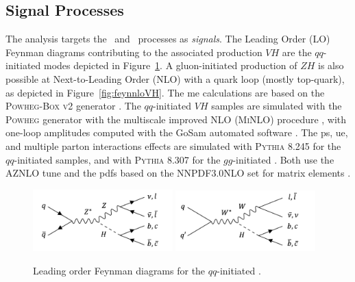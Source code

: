\subsection{Signal Processes}
The analysis targets the \vhb\ and \vhc\ processes as \textit{signals}. The Leading Order (LO) Feynman diagrams contributing to the associated production $VH$ are the $qq$-initiated modes depicted in Figure~\ref{fig:feynloVH}. A gluon-initiated production of $ZH$ is also possible at Next-to-Leading Order (NLO) with a quark loop (mostly top-quark), as depicted in Figure~\ref{fig:feynnloVH}. The \gls{me} calculations are based on the \textsc{Powheg-Box v2} generator \cite{StefanoFrixione_20072, POWHEGBOX}. The $qq$-initiated $VH$ samples are simulated with the \textsc{Powheg} generator with the multiscale improved NLO (\textsc{MiNLO}) procedure \cite{powhegHW}, with one-loop amplitudes computed with the GoSam automated software \cite{gosam}. The \gls{ps}, \gls{ue}, and multiple parton interactions effects are simulated with \textsc{Pythia} 8.245 for the $qq$-initiated samples, and with \textsc{Pythia} 8.307 for the $gg$-initiated \cite{SJOSTRAND2015159}. Both use the AZNLO tune \cite{measureZGboson} and the \glspl{pdf} based on the \textsc{NNPDF3.0NLO} set for matrix elements \cite{PDFLHCrun2}. \\

\begin{figure}[h!]
  \center
  \includegraphics[width=0.48\textwidth]{Images/VH/Feynman/zh.png}
  \includegraphics[width=0.48\textwidth]{Images/VH/Feynman/wh.png}
  \caption{Leading order Feynman diagrams for the $qq$-initiated \vhbc.} 
  \label{fig:feynloVH}
\end{figure}

